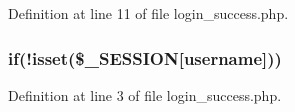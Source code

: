 Definition at line 11 of file login\+\_\+success.\+php.

\hypertarget{php_2login__success_8php_a417be69c2182c77301b6d9d54792e7e5}{}
\subsubsection[{if}]{\setlength{\rightskip}{0pt plus 5cm}if(!isset(\$\+\_\+\+S\+E\+S\+S\+I\+O\+N\mbox{[}\textquotesingle{}username\textquotesingle{}\mbox{]}))}\label{php_2login__success_8php_a417be69c2182c77301b6d9d54792e7e5}


Definition at line 3 of file login\+\_\+success.\+php.

